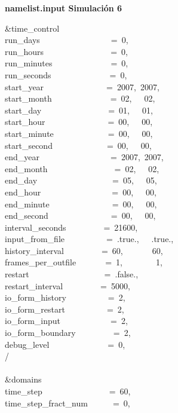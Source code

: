 
\textbf{namelist.input Simulación 6}

\&time\_control~~~~~~~~~~~~\\
run\_days~~~~~~~~~~~~~~~~~=~0,\\
run\_hours~~~~~~~~~~~~~~~~=~0,\\
run\_minutes~~~~~~~~~~~~~~=~0,\\
run\_seconds~~~~~~~~~~~~~~=~0,\\
start\_year~~~~~~~~~~~~~~~=~2007,~2007,~\\
start\_month~~~~~~~~~~~~~~=~02,~~~02,~~~\\
start\_day~~~~~~~~~~~~~~~~=~01,~~~01,~~~\\
start\_hour~~~~~~~~~~~~~~~=~00,~~~00,~~~\\
start\_minute~~~~~~~~~~~~~=~00,~~~00,~~~\\
start\_second~~~~~~~~~~~~~=~00,~~~00,~~~\\
end\_year~~~~~~~~~~~~~~~~~=~2007,~2007,~\\
end\_month~~~~~~~~~~~~~~~~=~02,~~~02,~~~\\
end\_day~~~~~~~~~~~~~~~~~~=~05,~~~05,~~~\\
end\_hour~~~~~~~~~~~~~~~~~=~00,~~~00,~~~\\
end\_minute~~~~~~~~~~~~~~~=~00,~~~00,~~~\\
end\_second~~~~~~~~~~~~~~~=~00,~~~00,~~~\\
interval\_seconds~~~~~~~~~=~21600,\\
input\_from\_file~~~~~~~~~~=~.true.,~~~.true.,~\\
history\_interval~~~~~~~~~=~60,~~~~~~~60,~~~~~\\
frames\_per\_outfile~~~~~~~=~1,~~~~~~~~1,~~~~~~\\
restart~~~~~~~~~~~~~~~~~~=~.false.,\\
restart\_interval~~~~~~~~~=~5000,\\
io\_form\_history~~~~~~~~~~=~2,\\
io\_form\_restart~~~~~~~~~~=~2,\\
io\_form\_input~~~~~~~~~~~~=~2,\\
io\_form\_boundary~~~~~~~~~=~2,\\
debug\_level~~~~~~~~~~~~~~=~0,\\
/\\
\\
\&domains~~~~~~~~~~~~~~~~~\\
time\_step~~~~~~~~~~~~~~~~=~60,\\
time\_step\_fract\_num~~~~~~=~0,\\
